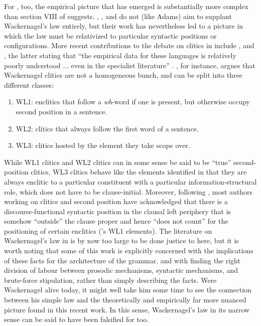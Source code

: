 \documentclass[output=paper]{../langscibook}
\begin{document}
For , too, the empirical picture that has emerged is substantially more complex than section VIII of \citet{Wackernagel1892} suggests. \citet{Hale1987PhD,Hale1987wackernagel,Hale1996}, \citet{Krisch1990}, and \citet{Hock1996} do not (like Adams) aim to supplant Wackernagel's law entirely, but their work has nevertheless led to a picture in which the law must be relativized to particular syntactic positions or configurations. More recent contributions to the debate on clitics in  include \citet{Keydana2011}, \citet{Lowe2014} and \citet{Hale2017}, the latter stating that ``the empirical data for these languages is relatively poorly understood ... even in the specialist literature'' \citeyearpar[290]{Hale2017}. \citet{Keydana2011}, for instance, argues that Wackernagel clitics are not a homogeneous bunch, and can be split into three different classes:

\begin{enumerate}
    \item WL1: enclitics that follow a \textit{wh}-word if one is present, but otherwise occupy second position in a sentence.
    \item WL2: clitics that always follow the first word of a sentence.
    \item WL3: clitics hosted by the element they take scope over.
\end{enumerate}

While WL1 clitics and WL2 clitics can in some sense be said to be ``true'' second-position clitics, WL3 clitics behave like the elements    \citet{Adams1994book,Adams1994pronouns} identified in that they are always enclitic to a particular constituent with a particular information-structural role, which does not have to be clause-initial. Moreover, following \citet{Hale1987PhD,Hale1987wackernagel}, most authors working on  clitics and second position have acknowledged that there is a discourse-functional syntactic position in the clausal left periphery that is somehow ``outside'' the clause proper and hence ``does not count'' for the positioning of certain enclitics (\citeauthor{Keydana2011}'s WL1 elements). The literature on Wackernagel's law in  is by now too large to be done justice to here, but it is worth noting that some of this work is explicitly concerned with the implications of these facts for the architecture of the grammar, and with finding the right division of labour between prosodic mechanisms, syntactic mechanisms, and brute-force stipulation, rather than simply describing the facts. Were Wackernagel alive today, it might well take him some time to see the connection between his simple law and the theoretically and empirically far more nuanced picture found in this recent work. In this sense, Wackernagel's law in its narrow sense can be said to have been falsified for  too.
\end{document}
